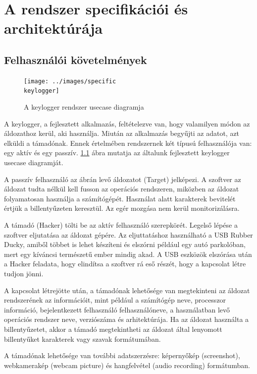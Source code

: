 \documentclass[12pt,a4paper,oneside]{report}
\begin{document}
\chapter{A rendszer specifikációi és architektúrája}\label{sec:specs_and_arch}

\section{Felhasználói követelmények}
\begin{figure}[H]
\centering
\texttt{[image: ../images/specific\\ keylogger]}
\caption{A keylogger rendszer usecase diagramja}
\label{fig:specifickeylogger}
\end{figure}
A keylogger, a fejlesztett alkalmazás, feltételezve van, hogy valamilyen módon az áldozathoz kerül, aki használja. Miután az alkalmazás begyűjti az adatot, azt elküldi a támadónak. Ennek értelmében rendszernek két típusú felhasználója van: egy aktív és egy passzív. \ref{fig:specifickeylogger} ábra mutatja az általunk fejlesztett keylogger usecase diagramját.

A passzív felhasználó az ábrán levő áldozatot (Target) jelképezi. A szoftver az áldozat tudta nélkül kell fusson az operációs rendszeren, miközben az áldozat folyamatosan használja a számítógépét. Használat alatt karakterek bevitelét értjük a billentyűzeten keresztül. Az egér mozgása nem kerül monitorizálásra.

A támadó (Hacker) tölti be az aktív felhasználó szerepkörét. Legelső lépése a szoftver eljutatása az áldozat gépére. Az eljuttatáshoz használható a USB Rubber Ducky, amiből többet is lehet készíteni és elszórni például egy autó parkolóban, mert egy kíváncsi természetű ember mindig akad. A USB eszközök elszórása után a Hacker feladata, hogy elindítsa a szoftver rá eső részét, hogy a kapcsolat létre tudjon jönni.

A kapcsolat létrejötte után, a támadónak lehetősége van megtekinteni az áldozat rendszerének az információit, mint például a számítógép neve, processzor információ, bejelentkezett felhasználó felhasználóneve, a használatban levő operációs rendszer neve, verziószáma és arhitektúrája. Ha az áldozat használta a billentyűzetet, akkor a támadó megtekintheti az áldozat által lenyomott billentyűket karakterek vagy szavak formátumában.

A támadónak lehetősége van további adatszerzésre: képernyőkép (screenshot), webkamerakép (webcam picture) és hangfelvétel (audio recording) formátumban.
\end{document}
